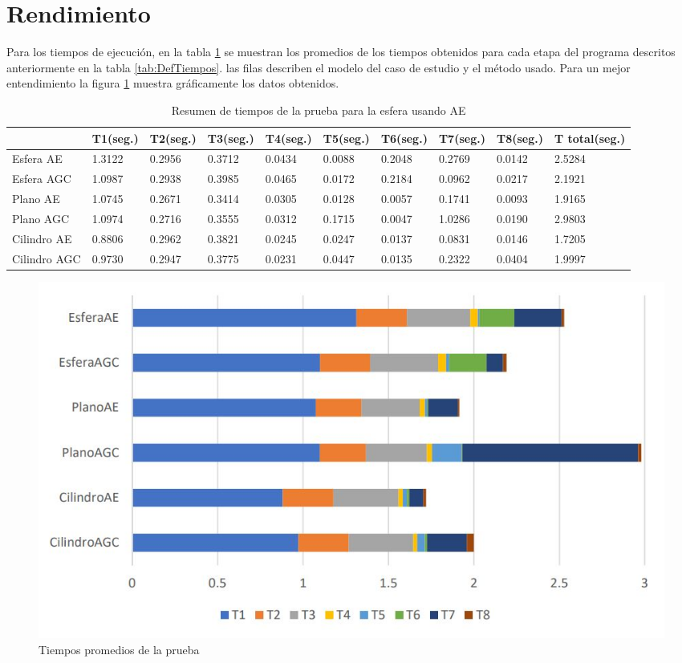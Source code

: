 \section{Rendimiento}
Para los tiempos de ejecución, en la tabla \ref{tab:tiempos} se muestran los promedios de los tiempos obtenidos para cada etapa del programa descritos anteriormente en la tabla \ref{tab:DefTiempos}. las filas describen el modelo del caso de estudio y el método usado. Para un mejor entendimiento la figura \ref{fig:ttotal} muestra gráficamente los datos obtenidos.\\

\begin{table}[!htb]
	\caption{Resumen de tiempos de la prueba para la esfera usando AE}
	\centering
	\scriptsize 
	\begin{tabular}{llllllllll}
		\hline
		& T1(seg.) & T2(seg.) & T3(seg.) & T4(seg.) & T5(seg.) & T6(seg.) & T7(seg.) & T8(seg.) & T total(seg.) \\ \hline
		Esfera AE & 1.3122 & 0.2956 & 0.3712 & 0.0434 & 0.0088 & 0.2048 & 0.2769 & 0.0142 & 2.5284 \\
		Esfera AGC & 1.0987 & 0.2938 & 0.3985 & 0.0465 & 0.0172 & 0.2184 & 0.0962 & 0.0217 & 2.1921 \\	
		Plano AE & 1.0745 & 0.2671 & 0.3414 & 0.0305 & 0.0128 & 0.0057 & 0.1741 & 0.0093 & 1.9165 \\ 
		Plano AGC & 1.0974 & 0.2716 & 0.3555 & 0.0312 & 0.1715 & 0.0047 & 1.0286 & 0.0190 & 2.9803 \\
		Cilindro AE & 0.8806 & 0.2962 & 0.3821 & 0.0245 & 0.0247 & 0.0137 & 0.0831 & 0.0146 & 1.7205 \\
		Cilindro AGC & 0.9730 & 0.2947 & 0.3775 & 0.0231 & 0.0447 & 0.0135 & 0.2322 & 0.0404 & 1.9997 \\
		
		\hline
	\end{tabular}
	\label{tab:tiempos}
\end{table}


\begin{figure}[!htb]
	\centering
	\includegraphics[width=1\textwidth]{03Resultados/imagenes/tTotal.JPG}
	\caption{Tiempos promedios de la prueba} 
	\label{fig:ttotal} 
\end{figure}


